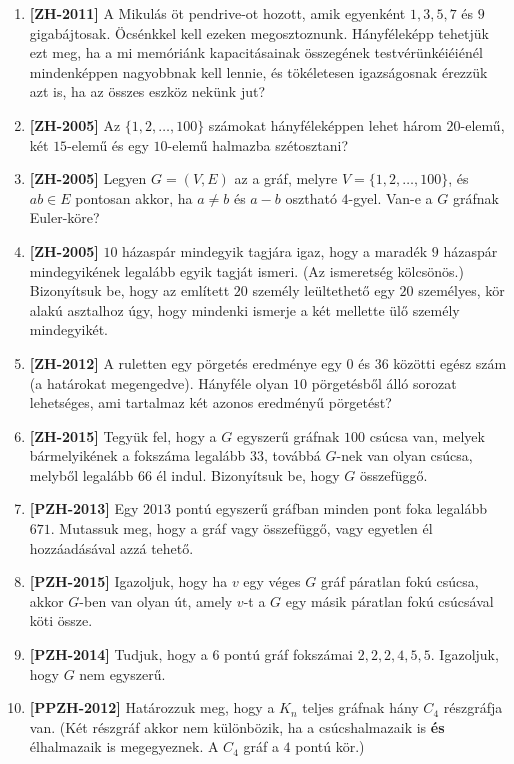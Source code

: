 \documentclass[a4paper, 12pt]{article}
\begin{document}
\begin{enumerate}
        \item \textbf{[ZH-2011]} A Mikulás öt pendrive-ot hozott, amik egyenként $1,3,5,7$ és $9$ gigabájtosak. Öcsénkkel kell ezeken megosztoznunk. Hányféleképp tehetjük ezt meg, ha a mi memóriánk kapacitásainak összegének testvérünkéiéiénél mindenképpen nagyobbnak kell lennie, és tökéletesen igazságosnak érezzük azt is, ha az összes eszköz nekünk jut?
        \item \textbf{[ZH-2005]} Az $\{1,2,\ldots,100\}$ számokat hányféleképpen lehet három $20$-elemű, két $15$-elemű és egy $10$-elemű halmazba szétosztani?
        \item \textbf{[ZH-2005]} Legyen $G=(V,E)$ az a gráf, melyre $V=\{1,2,\ldots,100\}$, és $ab \in E$ pontosan akkor, ha $a \neq b$ és $a-b$ osztható $4$-gyel. Van-e a $G$ gráfnak Euler-köre?
        \item \textbf{[ZH-2005]} $10$ házaspár mindegyik tagjára igaz, hogy a maradék $9$ házaspár mindegyikének legalább egyik tagját ismeri. (Az ismeretség kölcsönös.) Bizonyítsuk be, hogy az említett $20$ személy leültethető egy $20$ személyes, kör alakú asztalhoz úgy, hogy mindenki ismerje a két mellette ülő személy mindegyikét.
        \item \textbf{[ZH-2012]} A ruletten egy pörgetés eredménye egy $0$ és $36$ közötti egész szám (a határokat megengedve). Hányféle olyan $10$ pörgetésből álló sorozat lehetséges, ami tartalmaz két azonos eredményű pörgetést?
        \item \textbf{[ZH-2015]} Tegyük fel, hogy a $G$ egyszerű gráfnak $100$ csúcsa van, melyek bármelyikének a fokszáma legalább $33$, továbbá $G$-nek van olyan csúcsa, melyből legalább $66$ él indul. Bizonyítsuk be, hogy $G$ összefüggő.
        \item \textbf{[PZH-2013]} Egy $2013$ pontú egyszerű gráfban minden pont foka legalább $671$. Mutassuk meg, hogy a gráf vagy összefüggő, vagy egyetlen él hozzáadásával azzá tehető.
        \item \textbf{[PZH-2015]} Igazoljuk, hogy ha $v$ egy véges $G$ gráf páratlan fokú csúcsa, akkor $G$-ben van olyan út, amely $v$-t a $G$ egy másik páratlan fokú csúcsával köti össze.
        \item \textbf{[PZH-2014]} Tudjuk, hogy a $6$ pontú gráf fokszámai $2,2,2,4,5,5$. Igazoljuk, hogy $G$ nem egyszerű.
        \item \textbf{[PPZH-2012]} Határozzuk meg, hogy a $K_n$ teljes gráfnak hány $C_4$ részgráfja van. (Két részgráf akkor nem különbözik, ha a csúcshalmazaik is \textbf{és} élhalmazaik is megegyeznek. A $C_4$ gráf a $4$ pontú kör.)

\end{enumerate}
\end{document}
